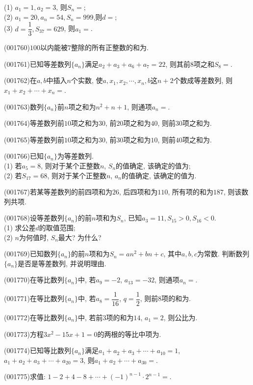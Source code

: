 (1) $a_1=1,a_2=3$, 则$S_n=$;\\ 
(2) $a_1=20,a_n=54,S_n=999$,则$d=$;\\ 
(3) $d=\dfrac{1}{3},S_{37}=629$, 则$a_1=$.
\item (001760)$100$以内能被$7$整除的所有正整数的和为.
\item (001761)已知等差数列$\{a_n\}$满足$a_2+a_3+a_6+a_7=22$, 则其前$8$项之和$S_8=$.
\item (001762)在$a,b$中插入$n$个实数, 使$a,x_1,x_2,\cdots,x_n,b$这$n+2$个数成等差数列, 则$x_1+x_2+\cdots+x_n=$.
\item (001763)数列$\{a_n\}$前$n$项之和为$n^2+n+1$, 则通项$a_n=$.
\item (001764)等差数列前$10$项之和为$30$, 前$20$项之和为$40$, 则前$30$项之和为.
\item (001765)等差数列前$10$项之和为$30$, 前$30$项之和为$10$, 则前$40$项之和为.
\item (001766)已知$\{a_n\}$为等差数列.\\ 
(1) 若$a_5=8$, 则对于某个正整数$n$, $S_n$的值确定, 该确定的值为;\\ 
(2) 若$S_{17}=68$, 则对于某个正整数$n$, $a_n$的值确定, 该确定的值为.
\item (001767)若某等差数列的前四项和为$26$, 后四项和为$110$, 所有项的和为$187$, 则该数列共项.
\item (001768)设等差数列$\{a_n\}$的前$n$项和为$S_n$, 已知$a_3=11,S_{15}>0,S_{16}<0$.\\ 
(1) 求公差$d$的取值范围;\\ 
(2) $n$为何值时, $S_n$最大? 为什么?
\item (001769)已知数列$\{a_n\}$的前$n$项和为$S_n=an^2+bn+c$, 其中$a,b,c$为常数. 判断数列$\{a_n\}$是否是等差数列, 并说明理由.
\item (001770)在等比数列$\{a_n\}$中, 若$a_9=-2$, $a_{13}=-32$, 则通项$a_n=$.
\item (001771)在等比数列$\{a_n\}$中, 若$a_8=\dfrac{1}{16}$, $q=\dfrac{1}{2}$, 则前$8$项的和为.
\item (001772)在等比数列$\{a_n\}$中, 若前$3$项的和为$14$, $a_1=2$, 则公比为.
\item (001773)方程$3x^2-15x+1=0$的两根的等比中项为.
\item (001774)已知等比数列$\{a_n\}$满足$a_1+a_2+a_3+\cdots+a_{10}=1$, $a_{1}+a_{2}+a_{3}+\cdots+a_{20}=3$, 则$a_{1}+a_{2}+\cdots+a_{30}=$.
\item (001775)求值: $1-2+4-8+\cdots+(-1)^{n-1}\cdot 2^{n-1}=$.
